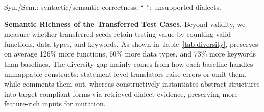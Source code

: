 \documentclass[conference]{IEEEtran}
\begin{document}
\begin{table}[!htbp]
\centering
\caption{Syntactic and semantic correctness of transferred seeds.}
\label{tab:validity}
\renewcommand\arraystretch{1}
\scriptsize
\setlength{\tabcolsep}{1.5pt}
\par\vspace{0.2em}
{\footnotesize Syn./Sem.: syntactic/semantic correctness; ``-'': unsupported dialects.}
\end{table}


\textbf{Semantic Richness of the Transferred Test Cases.}
Beyond validity, we measure whether transferred seeds retain testing value by counting valid functions, data types, and keywords.
As shown in Table~\ref{tab:diversity}, \tool{} preserves on average 126\% more functions, 60\% more data types, and 73\% more keywords than baselines.
The diversity gap mainly comes from how each baseline handles unmappable constructs: statement-level translators raise errors or omit them, while \sedar{} comments them out, whereas \tool{} constructively instantiates abstract structures into target-compliant forms via retrieved dialect evidence, preserving more feature-rich inputs for mutation.
\end{document}
